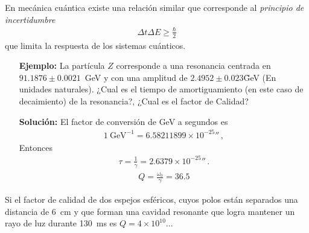 \begin{frame}
  En mecánica cuántica existe una relación similar que corresponde al \emph{principio de incertidumbre}
\begin{align*}
  \Delta t \Delta E\ge \frac{\hbar}{2}
\end{align*}
que limita la respuesta de los sistemas cuánticos. 
\end{frame}
\begin{itemize}
\item[\textbf{Ejemplo:}] La partícula $Z$ corresponde a una resonancia centrada en $91.1876\pm 0.0021$~GeV y con una amplitud de $2.4952\pm0.023$\~GeV (En unidades naturales). ¿Cual es el tiempo de amortiguamiento (en este caso de decaimiento) de la resonancia?, ¿Cual es el factor de Calidad? 

\item[\textbf{Solución:}] El factor de conversión de GeV  a segundos es
  \begin{align*}
    1\ \text{GeV}^{-1}=6.58211899\times 10^{-25}\second\,,
  \end{align*}
  Entonces
  \begin{align*}
    \tau=\frac{1}{\gamma}=2.6379\times10^{-25}\second\,.
  \end{align*}
  \begin{align*}
    Q=\frac{\omega_0}{\gamma}=36.5
  \end{align*}
\end{itemize}

\ejemplo{} Si el factor de calidad de dos espejos esféricos, cuyos polos están separados una distancia de 6~cm y que forman una cavidad resonante que logra mantener un rayo de luz durante 130~ms es $Q=4\times 10^{10}$...  




